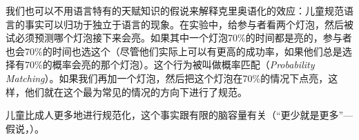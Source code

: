 我们也可以不用语言特有的天赋知识的假说来解释克里奥语化的效应：儿童规范语言的事实可以归功于独立于语言的现象。在实验中，给参与者看两个灯泡，然后被试必须预测哪个灯泡接下来会亮。如果其中一个灯泡70\%的时间都是亮的，参与者也会70\%的时间也选这个（尽管他们实际上可以有更高的成功率，如果他们总是选择有70\%的概率会亮的那个灯泡）。这个行为被叫做概率匹配（\emph{Probability Matching}）。如果我们再加一个灯泡，然后把这个灯泡在70\%的情况下点亮，这样，他们就在这个最为常见的情况的方向下进行了规范\citep{Gardener57a,Weir64a}。

儿童比成人更多地进行规范化\citep{HudsonN99a,HKN2005a}，这个事实跟有限的脑容量有关（“更少就是更多”—假说，\citealp{Newport90a,Elman93a}）。

